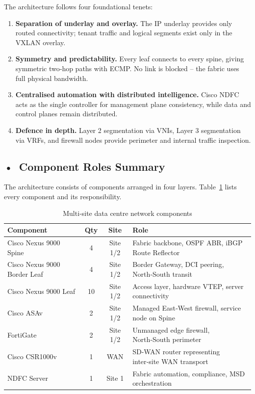 The architecture follows four foundational tenets:
\begin{enumerate}
    \item \textbf{Separation of underlay and overlay.} The IP underlay provides only routed connectivity; tenant traffic and logical segments exist only in the VXLAN overlay.
    \item \textbf{Symmetry and predictability.} Every leaf connects to every spine, giving symmetric two‑hop paths with ECMP. No link is blocked – the fabric uses full physical bandwidth.
    \item \textbf{Centralised automation with distributed intelligence.} Cisco NDFC acts as the single controller for management plane consistency, while data and control planes remain distributed.
    \item \textbf{Defence in depth.} Layer 2 segmentation via VNIs, Layer 3 segmentation via VRFs, and firewall nodes provide perimeter and internal traffic inspection.
\end{enumerate}

\subsection*{\mbox{•}~Component Roles Summary}
The architecture consists of components arranged in four layers. Table~\ref{tab:component-roles} lists every component and its responsibility.

\begin{table}[!htbp]
\small
\centering
\begin{tabularx}{\textwidth}{|p{5cm}|c|c|X|}
\hline
\textbf{Component} & \textbf{Qty} & \textbf{Site} & \textbf{Role} \\ \hline
Cisco Nexus 9000 Spine & 4 & Site 1/2 & Fabric backbone, OSPF ABR, iBGP Route Reflector \\ \hline
Cisco Nexus 9000 Border Leaf & 4 & Site 1/2 & Border Gateway, DCI peering, North‑South transit \\ \hline
Cisco Nexus 9000 Leaf & 10 & Site 1/2 & Access layer, hardware VTEP, server connectivity \\ \hline
Cisco ASAv & 2 & Site 1/2 & Managed East‑West firewall, service node on Spine \\ \hline
FortiGate & 2 & Site 1/2 & Unmanaged edge firewall, North‑South perimeter \\ \hline
Cisco CSR1000v & 1 & WAN & SD‑WAN router representing inter‑site WAN transport \\ \hline
NDFC Server & 1 & Site 1 & Fabric automation, compliance, MSD orchestration \\ \hline
\end{tabularx}
\caption{Multi‑site data centre network components}
\label{tab:component-roles}
\end{table}

